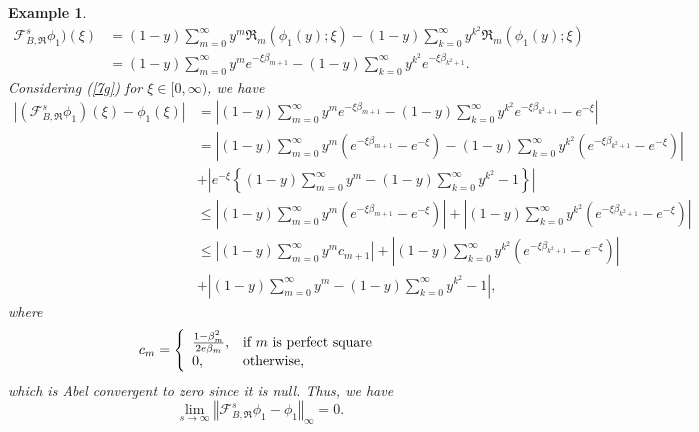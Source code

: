 \documentclass{amsart}
\theoremstyle{plain}
\newtheorem{example}{Example}
\numberwithin{equation}{section}
\begin{document}
\begin{example}
\begin{align*}
\mathcal{F}%
_{B,\Re}^{s}\phi_{1})(\xi) &  =(1-y)\sum_{m=0}^{\infty}y^{m}\Re_{m}(\phi
_{1}\left(  y\right)  ;\xi)-\left(  1-y\right)  \sum_{k=0}^{\infty}y^{k^{2}%
}\Re_{m}(\phi_{1}\left(  y\right)  ;\xi)\\
&  =(1-y)\sum_{m=0}^{\infty}y^{m}e^{-\xi \beta_{m+1}}-\left(  1-y\right)
\sum_{k=0}^{\infty}y^{k^{2}}e^{-\xi \beta_{k^{2}+1}}.
\end{align*}
Considering (\ref{7g}) for $\xi \in \lbrack0,\infty)$, we have%
\begin{align}
\left \vert \left(
\mathcal{F}%
_{B,\Re}^{s}\phi_{1}\right)  \left(  \xi \right)  -\phi_{1}\left(  \xi \right)
\right \vert  &  =\left \vert (1-y)\sum_{m=0}^{\infty}y^{m}e^{-\xi \beta_{m+1}%
}-\left(  1-y\right)  \sum_{k=0}^{\infty}y^{k^{2}}e^{-\xi \beta_{k^{2}+1}%
}-e^{-\xi}\right \vert \nonumber \\
&  =\left \vert (1-y)\sum_{m=0}^{\infty}y^{m}\left(  e^{-\xi \beta_{m+1}%
}-e^{-\xi}\right)  -\left(  1-y\right)  \sum_{k=0}^{\infty}y^{k^{2}}\left(
e^{-\xi \beta_{k^{2}+1}}-e^{-\xi}\right)  \right \vert \nonumber \\
&  +\left \vert e^{-\xi}\left \{  (1-y)\sum_{m=0}^{\infty}y^{m}-\left(
1-y\right)  \sum_{k=0}^{\infty}y^{k^{2}}-1\right \}  \right \vert \nonumber \\
&  \leq \left \vert (1-y)\sum_{m=0}^{\infty}y^{m}\left(  e^{-\xi \beta_{m+1}%
}-e^{-\xi}\right)  \right \vert +\left \vert \left(  1-y\right)  \sum
_{k=0}^{\infty}y^{k^{2}}\left(  e^{-\xi \beta_{k^{2}+1}}-e^{-\xi}\right)
\right \vert \nonumber \\
&  \leq \left \vert (1-y)\sum_{m=0}^{\infty}y^{m}c_{m+1}\right \vert +\left \vert
\left(  1-y\right)  \sum_{k=0}^{\infty}y^{k^{2}}\left(  e^{-\xi \beta_{k^{2}%
+1}}-e^{-\xi}\right)  \right \vert \nonumber \\
&  +\left \vert (1-y)\sum_{m=0}^{\infty}y^{m}-\left(  1-y\right)  \sum
_{k=0}^{\infty}y^{k^{2}}-1\right \vert ,\label{16}%
\end{align}
where%
\[
c_{m}=\left \{
\begin{array}
[c]{ll}%
\frac{1-\beta_{m}^{2}}{2e\beta_{m}}, & \text{if }m\text{ is perfect square}\\
0, & \text{otherwise,}%
\end{array}
\right.
\]
which is Abel convergent to zero since it is null. Thus, we have%
\[
\lim_{s\rightarrow \infty}\left \Vert
\mathcal{F}%
_{B,\Re}^{s}\phi_{1}-\phi_{1}\right \Vert _{\infty}=0\text{.}%
\]
\end{example}
\end{document}

